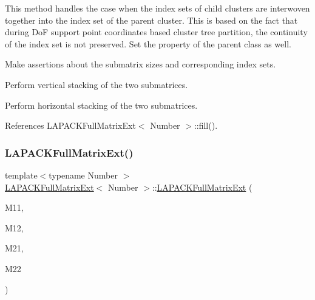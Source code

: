 This method handles the case when the index sets of child clusters are interwoven together into the index set of the parent cluster. This is based on the fact that during DoF support point coordinates based cluster tree partition, the continuity of the index set is not preserved. Set the property of the parent class as well.

Make assertions about the submatrix sizes and corresponding index sets.

Perform vertical stacking of the two submatrices.

Perform horizontal stacking of the two submatrices.

References L\+A\+P\+A\+C\+K\+Full\+Matrix\+Ext$<$ Number $>$\+::fill().

\mbox{\label{classLAPACKFullMatrixExt_aa94c466249d0df9e122443c0b6263cf3}} 
\subsubsection{\texorpdfstring{L\+A\+P\+A\+C\+K\+Full\+Matrix\+Ext()}{LAPACKFullMatrixExt()}\hspace{0.1cm}{\footnotesize\ttfamily [9/10]}}
{\footnotesize\ttfamily template$<$typename Number $>$ \\
\hyperlink{classLAPACKFullMatrixExt}{L\+A\+P\+A\+C\+K\+Full\+Matrix\+Ext}$<$ Number $>$\+::\hyperlink{classLAPACKFullMatrixExt}{L\+A\+P\+A\+C\+K\+Full\+Matrix\+Ext} (\begin{DoxyParamCaption}\item[{const \hyperlink{classLAPACKFullMatrixExt}{L\+A\+P\+A\+C\+K\+Full\+Matrix\+Ext}$<$ Number $>$ \&}]{M11,  }\item[{const \hyperlink{classLAPACKFullMatrixExt}{L\+A\+P\+A\+C\+K\+Full\+Matrix\+Ext}$<$ Number $>$ \&}]{M12,  }\item[{const \hyperlink{classLAPACKFullMatrixExt}{L\+A\+P\+A\+C\+K\+Full\+Matrix\+Ext}$<$ Number $>$ \&}]{M21,  }\item[{const \hyperlink{classLAPACKFullMatrixExt}{L\+A\+P\+A\+C\+K\+Full\+Matrix\+Ext}$<$ Number $>$ \&}]{M22 }\end{DoxyParamCaption})}

